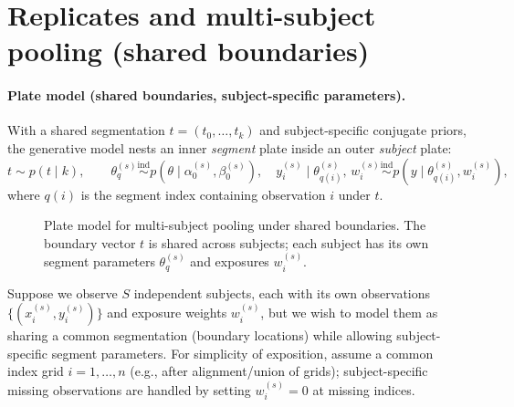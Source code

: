 \section{Replicates and multi-subject pooling (shared boundaries)}
\label{sec:replicates}

\paragraph{Plate model (shared boundaries, subject-specific parameters).}
With a shared segmentation $t=(t_0,\dots,t_k)$ and subject-specific conjugate priors,
the generative model nests an inner \emph{segment} plate inside an outer \emph{subject} plate:
\begin{equation}
t\sim p(t\mid k),\qquad
\theta^{(s)}_q \stackrel{\mathrm{ind}}{\sim} p(\theta\mid \alpha^{(s)}_0,\beta^{(s)}_0),\quad
y^{(s)}_i\mid \theta^{(s)}_{q(i)},\,w^{(s)}_i \stackrel{\mathrm{ind}}{\sim} p(y\mid \theta^{(s)}_{q(i)},w^{(s)}_i),
\label{eq:plate-replicates}
\end{equation}
where $q(i)$ is the segment index containing observation $i$ under $t$.
\begin{figure}[H]
\centering
{}
\caption[Shared-boundary multi-subject plate model]{Plate model for multi-subject pooling under shared boundaries. The boundary vector $t$ is shared across subjects; each subject has its own segment parameters $\theta^{(s)}_q$ and exposures $w^{(s)}_i$.}
\label{fig:plate-replicates}
\end{figure}

Suppose we observe $S$ independent subjects, each with its own observations
$\{(x^{(s)}_i,y^{(s)}_i)\}$ and exposure weights $w^{(s)}_i$, but we wish to model them as
sharing a common segmentation (boundary locations) while allowing subject-specific segment
parameters. For simplicity of exposition, assume a common index grid $i=1,\dots,n$ (e.g., after
alignment/union of grids); subject-specific missing observations are handled by setting $w^{(s)}_i=0$
at missing indices.


